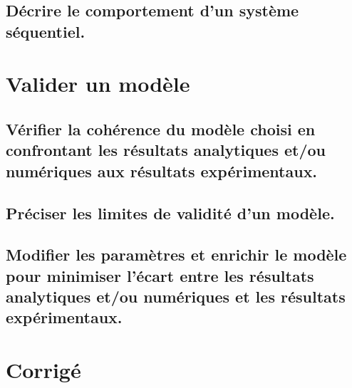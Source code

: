 \documentclass[10pt,fleqn]{article}
\newcommand{\repRel}{../..}
\newcommand{\repStyle}{\repRel/Style}
\newcommand{\td}{fichier_td}
\newcommand{\repExos}{\repRel/ExercicesCompetences}
\newcommand{\repExo}{dossier}
\begin{document}
\subsection{Décrire le comportement d'un système séquentiel.} 

\begin{multicols}{2} 

\renewcommand{\repExo}{\repExos/B2_ProposerModele/B2_17_Sequentiel/50_BancBalafre}
\renewcommand{\td}{50_BancBalafre}
\graphicspath{{\repStyle/png/}{\repExo/images/}}


\end{multicols}

\section{Valider un modèle} 

\subsection{Vérifier la cohérence du modèle choisi en confrontant les résultats analytiques et/ou numériques aux résultats expérimentaux.} 

\begin{multicols}{2} 

\end{multicols}

\subsection{Préciser les limites de validité d'un modèle.} 

\begin{multicols}{2} 

\end{multicols}

\subsection{Modifier les paramètres et enrichir le modèle pour minimiser l’écart entre les résultats analytiques et/ou numériques et les résultats expérimentaux.} 

\begin{multicols}{2} 

\end{multicols}

\proftrue
\setcounter{numexo}{0}

\section{Corrigé} 
\end{document}

